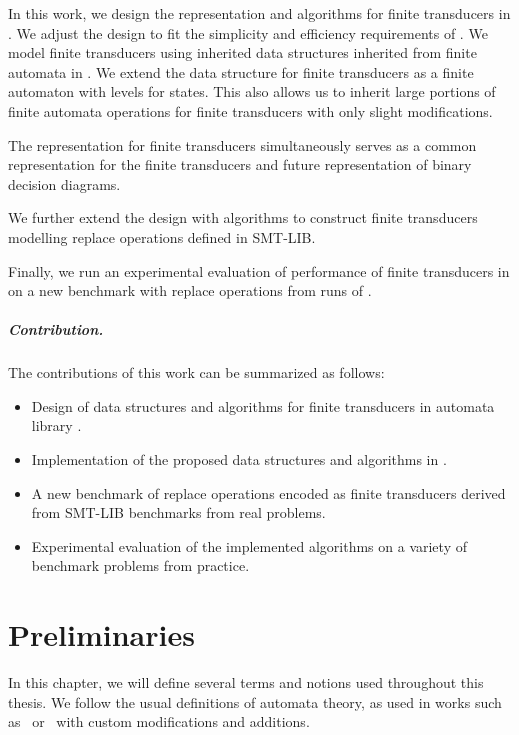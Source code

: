 In this work, we design the representation and algorithms for finite transducers in \mata.
We adjust the design to fit the simplicity and efficiency requirements of \mata.
We model finite transducers using inherited data structures inherited from finite automata in \mata.
We extend the data structure for finite transducers as a finite automaton with levels for states.
This also allows us to inherit large portions of finite automata operations for finite transducers with only slight modifications.

The representation for finite transducers simultaneously serves as a common representation for the finite transducers and future representation of binary decision diagrams.

We further extend the design with algorithms to construct finite transducers modelling replace operations defined in SMT-LIB.

Finally, we run an experimental evaluation of performance of finite transducers in \mata on a new benchmark with replace operations from runs of \noodler.

\paragraph{Contribution.}
The contributions of this work can be summarized as follows:
\begin{itemize}
  \item Design of data structures and algorithms for finite transducers in automata library \mata.
  \item Implementation of the proposed data structures and algorithms in \mata.
  \item A new benchmark of replace operations encoded as finite transducers derived from SMT-LIB benchmarks from real problems.
  \item Experimental evaluation of the implemented algorithms on a variety of benchmark problems from practice.
\end{itemize}

\chapter{Preliminaries}
\label{sec:Preliminaries}
In this chapter, we will define several terms and notions used throughout this thesis.
We follow the usual definitions of automata theory, as used in works such as~\cite{Esparza} or~\cite{Sipser} with custom modifications and additions.


